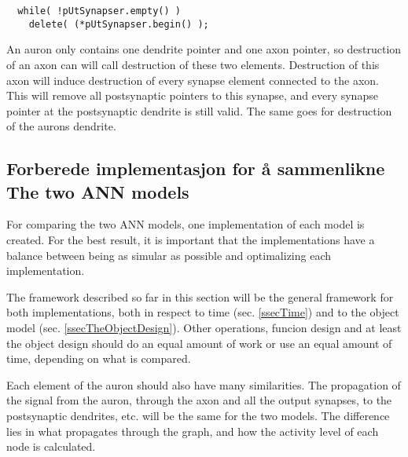 \begin{lstlisting}
  while( !pUtSynapser.empty() )
  	delete( (*pUtSynapser.begin() );
\end{lstlisting}

	An auron only contains one dendrite pointer and one axon pointer, so destruction of an axon can will call destruction of these two elements.
	Destruction of this axon will induce destruction of every synapse element connected to the axon. This will remove all postsynaptic pointers to this synapse, and every synapse pointer at the postsynaptic dendrite is still valid.
	The same goes for destruction of the aurons dendrite.
	


	


	\subsection{Forberede implementasjon for å sammenlikne The two ANN models}

	For comparing the two ANN models, one implementation of each model is created. 
	For the best result, it is important that the implementations have a balance between being as simular as possible and optimalizing each implementation.

	The framework described so far in this section will be the general framework for both implementations, both in respect to time (sec. \ref{ssecTime}) and to the object model (sec. \ref{ssecTheObjectDesign}).
	Other operations, funcion design and at least the object design should do an equal amount of work or use an equal amount of time, depending on what is compared. %

	Each element of the auron should also have many similarities. The propagation of the signal from the auron, through the axon and all the output synapses, to the postsynaptic dendrites, etc. will be the same for the two models.
	The difference lies in what propagates through the graph, and how the activity level of each node is calculated. 
	
